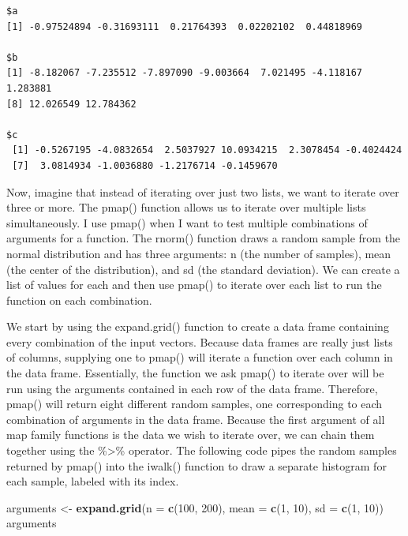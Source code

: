 \documentclass[
]{article}
\newenvironment{Shaded}{\begin{snugshade}}{\end{snugshade}}
\newcommand{\AttributeTok}[1]{\textcolor[rgb]{0.13,0.29,0.53}{#1}}
\newcommand{\DecValTok}[1]{\textcolor[rgb]{0.00,0.00,0.81}{#1}}
\newcommand{\FunctionTok}[1]{\textcolor[rgb]{0.13,0.29,0.53}{\textbf{#1}}}
\newcommand{\NormalTok}[1]{#1}
\newcommand{\OtherTok}[1]{\textcolor[rgb]{0.56,0.35,0.01}{#1}}
\begin{document}
\begin{verbatim}
$a
[1] -0.97524894 -0.31693111  0.21764393  0.02202102  0.44818969

$b
[1] -8.182067 -7.235512 -7.897090 -9.003664  7.021495 -4.118167  1.283881
[8] 12.026549 12.784362

$c
 [1] -0.5267195 -4.0832654  2.5037927 10.0934215  2.3078454 -0.4024424
 [7]  3.0814934 -1.0036880 -1.2176714 -0.1459670
\end{verbatim}

Now, imagine that instead of iterating over just two lists, we want to
iterate over three or more. The pmap() function allows us to iterate
over multiple lists simultaneously. I use pmap() when I want to test
multiple combinations of arguments for a function. The rnorm() function
draws a random sample from the normal distribution and has three
arguments: n (the number of samples), mean (the center of the
distribution), and sd (the standard deviation). We can create a list of
values for each and then use pmap() to iterate over each list to run the
function on each combination.

We start by using the expand.grid() function to create a data frame
containing every combination of the input vectors. Because data frames
are really just lists of columns, supplying one to pmap() will iterate a
function over each column in the data frame. Essentially, the function
we ask pmap() to iterate over will be run using the arguments contained
in each row of the data frame. Therefore, pmap() will return eight
different random samples, one corresponding to each combination of
arguments in the data frame. Because the first argument of all map
family functions is the data we wish to iterate over, we can chain them
together using the \%\textgreater\% operator. The following code pipes
the random samples returned by pmap() into the iwalk() function to draw
a separate histogram for each sample, labeled with its index.

\begin{Shaded}
\begin{Highlighting}[]
\NormalTok{arguments }\OtherTok{\textless{}{-}} \FunctionTok{expand.grid}\NormalTok{(}\AttributeTok{n =} \FunctionTok{c}\NormalTok{(}\DecValTok{100}\NormalTok{, }\DecValTok{200}\NormalTok{),}
                         \AttributeTok{mean =} \FunctionTok{c}\NormalTok{(}\DecValTok{1}\NormalTok{, }\DecValTok{10}\NormalTok{),}
                         \AttributeTok{sd =} \FunctionTok{c}\NormalTok{(}\DecValTok{1}\NormalTok{, }\DecValTok{10}\NormalTok{))}
\NormalTok{arguments}
\end{Highlighting}
\end{Shaded}
\end{document}
